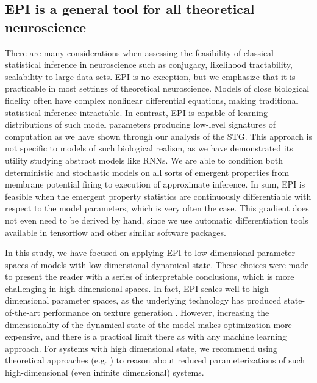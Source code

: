 \documentclass[11pt]{article}
\begin{document}
\subsection{EPI is a general tool for all theoretical neuroscience}
There are many considerations when assessing the feasibility of classical statistical inference in neuroscience such as conjugacy, likelihood tractability, scalability to large data-sets. 
EPI is no exception, but we emphasize that it is practicable in most settings of theoretical neuroscience.  
Models of close biological fidelity often have complex nonlinear differential equations, making traditional statistical inference intractable. 
In contrast, EPI is capable of learning distributions of such model parameters producing low-level signatures of computation as we have shown through our analysis of the STG. 
This approach is not specific to models of such biological realism, as we have demonstrated its utility studying abstract models like RNNs.  
We are able to condition both deterministic and stochastic models on all sorts of  emergent properties from membrane potential firing to execution of approximate inference.  
In sum, EPI is feasible when the emergent property statistics are continuously differentiable with respect to the model parameters, which is very often the case.  
This gradient does not even need to be derived by hand, since we use automatic differentiation tools available in tensorflow\cite{abadi2016tensorflow} and other similar software packages.

In this study, we have focused on applying EPI to low dimensional parameter spaces of models with low dimensional dynamical state.
These choices were made to present the reader with a series of  interpretable conclusions, which is more challenging in high dimensional spaces.
In fact, EPI scales well to high dimensional parameter spaces, as the underlying technology has produced state-of-the-art performance on texture generation \cite{loaiza2017maximum}.
However, increasing the dimensionality of the dynamical state of the model makes optimization more expensive, and there is a practical limit there as with any machine learning approach.
For systems with high dimensional state, we recommend using theoretical approaches (e.g. \cite{mastrogiuseppe2018linking}) to reason about reduced parameterizations of such high-dimensional (even infinite dimensional) systems.
\end{document}
